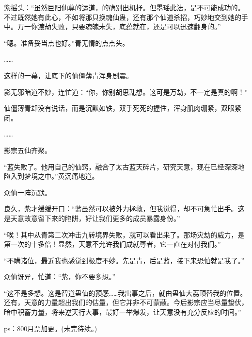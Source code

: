 \begin{this_body}
紫摇头：“虽然巨阳仙尊的运道，的确别出机抒。但墨瑶此法，是不可能成功的。不过既然她有此心，不如将那只换魂仙蛊，还有那个仙道杀招，巧妙地交到她的手中。万一你渡劫失败，只要魂魄未失，底蕴就在，还是可以迅速翻身的。”

“嗯。准备妥当点也好。”青无情的点点头。

……

这样的一幕，让底下的仙僵薄青浑身剧震。

影无邪暗道不妙，连忙道：“你，你别胡思乱想。这可是万劫，不一定是真的啊！”

仙僵薄青却没有说话，而是沉默如铁，双手死死的握住，浑身肌肉绷紧，双眼紧闭。

……

影宗五仙齐聚。

“蓝失败了。他用自己的仙窍，融合了太古蓝天碎片，研究天意，现在已经深深地陷入到梦境之中。”黄沉痛地道。

众仙一阵沉默。

良久，紫才缓缓开口：“蓝虽然可以被外力拯救，但我觉得，却不可急忙出手。这是天意故意留下来的陷阱，好让我们更多的成员暴露身份。”

“唉！其中从青第二次冲击九转境界失败，就可以看出来了。那场灾劫的威力，是第一次的十多倍！显然，天意不允许我们成就尊者，它一直在对付我们。”

“不瞒诸位，最近我也感觉到极度不妙。先是青，后是蓝，接下来恐怕就是我了。”

众仙讶异，忙道：“紫，你不要多想。”

“这不是多想。这是智道蛊仙的预感……我出事之后，就由蛊仙大荔顶替我的位置。还有，天意的力量超出我们的估量，但它并非不可蒙蔽。今后影宗应当尽量蛰伏，暗中积蓄力量，将来逆天行大事，最好一举爆发，让天意没有充分反应的时间。”

ps：800月票加更。(未完待续。)

\end{this_body}

